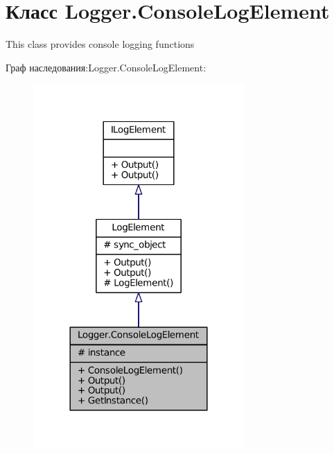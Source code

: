 \hypertarget{class_logger_1_1_console_log_element}{}\section{Класс Logger.\+Console\+Log\+Element}
\label{class_logger_1_1_console_log_element}


This class provides console logging functions  




Граф наследования\+:Logger.\+Console\+Log\+Element\+:
\nopagebreak
\begin{figure}[H]
\begin{center}
\leavevmode
\includegraphics[width=228pt]{class_logger_1_1_console_log_element__inherit__graph}
\end{center}
\end{figure}


